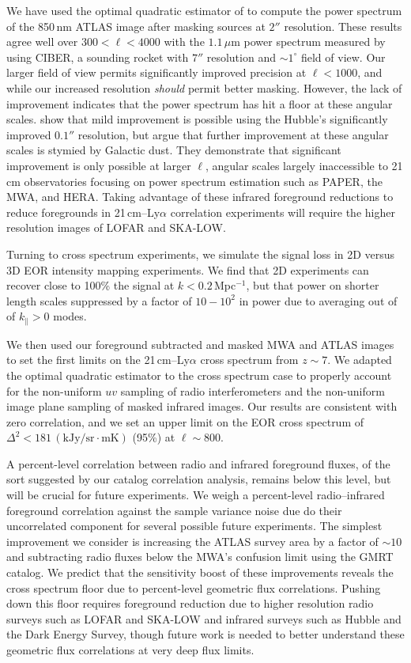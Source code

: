\documentclass[numberedappendix]{emulateapj}
\begin{document}
We have used the optimal quadratic estimator of \citet{Maxpowerspeclossless} to compute the power spectrum of the 850\,nm ATLAS image after masking sources at $2''$ resolution. These results agree well over $300<\ell<4000$ with the $1.1$\,$\mu$m power spectrum measured by \citep{zemcov14} using CIBER, a sounding rocket with $7''$ resolution and $\sim1^\circ$ field of view. Our larger field of view permits significantly improved precision at $\ell<1000$, and while our increased resolution \textit{should} permit better masking. However, the lack of improvement indicates that the power spectrum has hit a floor at these angular scales. \citet{mw15} show that mild improvement is possible using the Hubble's significantly improved $0.1''$ resolution, but argue that further improvement at these angular scales is stymied by Galactic dust. They demonstrate that significant improvement is only possible at larger $\ell$, angular scales largely inaccessible to 21\,cm observatories focusing on power spectrum estimation such as PAPER, the MWA, and HERA. Taking advantage of these infrared foreground reductions to reduce foregrounds in 21\,cm--Ly$\alpha$ correlation experiments will require the higher resolution images of  LOFAR and SKA-LOW.

Turning to cross spectrum experiments, we simulate the signal loss in 2D versus 3D EOR intensity mapping experiments. We find that 2D experiments can recover close to 100\% the signal at $k<0.2$\,Mpc$^{-1}$, but that power on shorter length scales  suppressed by a factor of $10-10^2$ in power due to averaging out of of $k_\parallel>0$ modes. 

We then used our foreground subtracted and masked MWA and ATLAS images to set the first limits on the 21\,cm--Ly$\alpha$ cross spectrum from $z\sim7$. We adapted the optimal quadratic estimator to the cross spectrum case to properly account for the non-uniform $uv$ sampling of radio interferometers and the non-uniform image plane sampling of masked infrared images. Our results are consistent with zero correlation, and we set an upper limit on the EOR cross spectrum of $\Delta^2<181$\,$(\text{kJy/sr}\cdot \text{mK})$ (95\%) at $\ell\sim800$.

A percent-level correlation between radio and infrared foreground fluxes, of the sort suggested by our catalog correlation analysis, remains below this level, but will be crucial for future experiments. We weigh a percent-level radio--infrared foreground correlation against the sample variance noise due do their uncorrelated component for several possible future experiments. The simplest improvement we consider is increasing the ATLAS survey area by a factor of $\sim10$ and subtracting radio fluxes below the MWA's confusion limit using the GMRT catalog. We predict that the sensitivity boost of these improvements reveals the cross spectrum floor due to percent-level geometric flux correlations. Pushing down this floor requires foreground reduction due to higher resolution radio surveys such as LOFAR and SKA-LOW and infrared surveys such as Hubble and the Dark Energy Survey, though future work is needed to better understand these geometric flux correlations at very deep flux limits.
\end{document}
